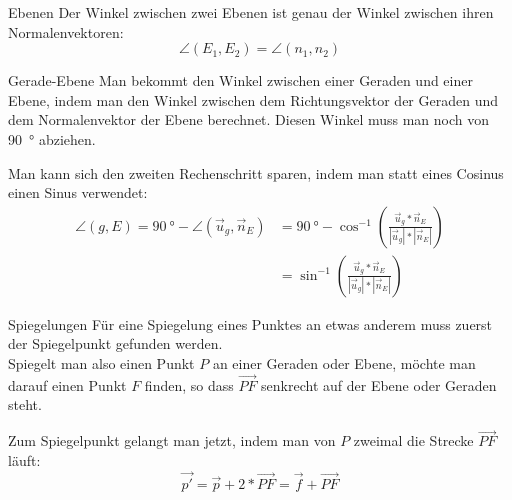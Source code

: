 \begin{bla}{Ebenen}
	Der Winkel zwischen zwei Ebenen ist genau der Winkel zwischen ihren Normalenvektoren:
	\[
	\angle(E_1,E_2) = \angle(n_1,n_2)
	\]
\end{bla}

\begin{bla}{Gerade-Ebene}
	Man bekommt den Winkel zwischen einer Geraden und einer Ebene, indem man den Winkel zwischen dem Richtungsvektor der Geraden und dem Normalenvektor der Ebene berechnet.
	Diesen Winkel muss man noch von \SI{90}{\degree} abziehen.

	Man kann sich den zweiten Rechenschritt sparen, indem man statt eines Cosinus einen Sinus verwendet:
	\begin{align*}
	\angle(g,E) = \SI{90}{\degree} - \angle(\vec u_g, \vec n_E)
	&= \SI{90}{\degree} - \cos^{-1} \left( \frac {\vec u_g * \vec n_E }{ |\vec u_g| * |\vec n_E| } \right)
	\\
	&= \sin^{-1} \left( \frac {\vec u_g * \vec n_E }{ |\vec u_g| * |\vec n_E| } \right)
	\end{align*}
\end{bla}

\begin{bla}
	{Spiegelungen}
	Für eine Spiegelung eines Punktes an etwas anderem muss zuerst der Spiegelpunkt gefunden werden.
	\\
	Spiegelt man also einen Punkt $P$ an einer Geraden oder Ebene, möchte man darauf einen Punkt $F$ finden, so dass $\overrightarrow{PF}$ senkrecht auf der Ebene oder Geraden steht.

	Zum Spiegelpunkt gelangt man jetzt, indem man von $P$ zweimal die Strecke $\overrightarrow{PF}$ läuft:
	\[
	\vec{p'} = \vec{p} + 2* \overrightarrow{PF} = \vec{f} + \overrightarrow{PF}
	\]
\end{bla}

\clearpage
